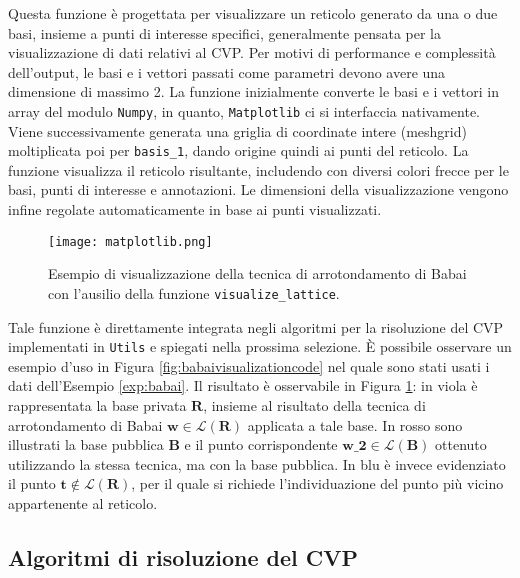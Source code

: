 Questa funzione è progettata per visualizzare un reticolo generato da una o due basi, 
insieme a punti di interesse specifici, generalmente pensata per la visualizzazione di dati
relativi al CVP. Per motivi di performance e complessità dell'output, le basi e i vettori 
passati come parametri devono avere una dimensione di massimo 2. 
La funzione inizialmente converte le basi e i vettori in array del modulo 
\texttt{Numpy}, in quanto, \texttt{Matplotlib} ci si interfaccia nativamente. 
Viene successivamente generata una griglia di coordinate intere (meshgrid) moltiplicata poi 
per \texttt{basis\_1}, dando origine quindi ai punti del reticolo.
La funzione visualizza il reticolo risultante, includendo con diversi colori
frecce per le basi, punti di interesse e annotazioni. Le dimensioni della visualizzazione 
vengono infine regolate automaticamente in base ai punti visualizzati. 

\begin{figure}[H]
    \centering
    \texttt{[image: matplotlib.png]}
    \caption[Esempio di output della funzione \texttt{visualize\_lattice}.]
    {Esempio di visualizzazione della tecnica di arrotondamento di Babai con l'ausilio
    della funzione \texttt{visualize\_lattice}.}
    \label{fig:babaivisualizationout}
\end{figure}

Tale funzione è direttamente integrata negli algoritmi per la risoluzione del CVP
implementati in \texttt{Utils} e spiegati nella prossima selezione. 
È possibile osservare un esempio d'uso in Figura \ref{fig:babaivisualizationcode} nel
quale sono stati usati i dati dell'Esempio \ref{exp:babai}. Il risultato è osservabile 
in Figura \ref{fig:babaivisualizationout}: in viola è rappresentata la base privata $\mathbf{R}$, 
insieme al risultato della tecnica di arrotondamento di Babai 
$\mathbf{w} \in \mathcal{L}(\mathbf{R})$ applicata a tale base.
In rosso sono illustrati la base pubblica $\mathbf{B}$ e il punto corrispondente 
$\mathbf{w\_2} \in \mathcal{L}(\mathbf{B})$ ottenuto utilizzando 
la stessa tecnica, ma con la base pubblica. In blu è invece 
evidenziato il punto $\mathbf{t} \notin \mathcal{L}(\mathbf{R})$, per il quale si richiede 
l'individuazione del punto più vicino appartenente al reticolo.


\subsection{Algoritmi di risoluzione del CVP}

